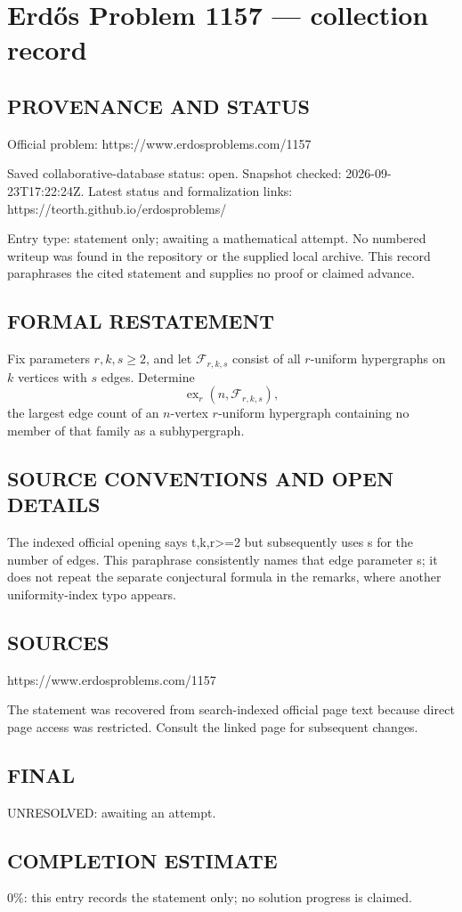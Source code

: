 \section*{Erd\H{o}s Problem 1157 --- collection record}

\subsection*{PROVENANCE AND STATUS}
Official problem: https://www.erdosproblems.com/1157

Saved collaborative-database status: open.
Snapshot checked: 2026-09-23T17:22:24Z.
Latest status and formalization links: https://teorth.github.io/erdosproblems/

Entry type: statement only; awaiting a mathematical attempt. No numbered writeup was found in the repository or the supplied local archive. This record paraphrases the cited statement and supplies no proof or claimed advance.

\subsection*{FORMAL RESTATEMENT}
Fix parameters $r,k,s\geq2$, and let $\mathcal F_{r,k,s}$ consist of all $r$-uniform hypergraphs on $k$ vertices with $s$ edges. Determine
\[
\operatorname{ex}_r(n,\mathcal F_{r,k,s}),
\]
the largest edge count of an $n$-vertex $r$-uniform hypergraph containing no member of that family as a subhypergraph.

\subsection*{SOURCE CONVENTIONS AND OPEN DETAILS}
The indexed official opening says t,k,r>=2 but subsequently uses s for the number of edges. This paraphrase consistently names that edge parameter s; it does not repeat the separate conjectural formula in the remarks, where another uniformity-index typo appears.

\subsection*{SOURCES}
https://www.erdosproblems.com/1157

The statement was recovered from search-indexed official page text because direct page access was restricted. Consult the linked page for subsequent changes.

\subsection*{FINAL}
UNRESOLVED: awaiting an attempt.

\subsection*{COMPLETION ESTIMATE}
$0\%$: this entry records the statement only; no solution progress is claimed.
